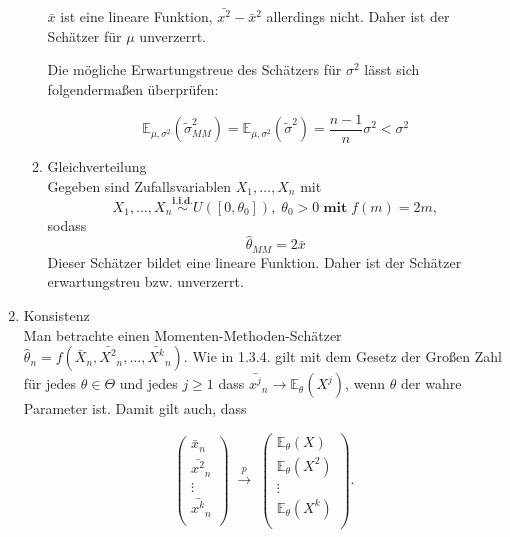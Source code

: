 \documentclass[10pt]{article}
\newcommand{\FZV}{X_1, \ldots, X_n} %
\newcommand{\EW}{\mathbb{E}} %
\begin{document}
\begin{enumerate}
\begin{enumerate}[label = (\roman*)]
		$\bar{x}$ ist eine lineare Funktion, $\bar{x^2}-\bar{x}^2$ allerdings nicht.  Daher ist der Schätzer für $\mu$ unverzerrt. 
		
		Die mögliche Erwartungstreue des Schätzers für $\sigma^2$ lässt sich folgendermaßen überprüfen:
		
		\begin{equation*}
			\EW_{\mu,\sigma^2} (\tilde{\sigma}^2_{MM}) = \EW_{\mu,\sigma^2} (\tilde{\sigma}^2) = \frac{n - 1 }{n} \sigma^2 < \sigma^2 
		\end{equation*}
	
			\item Gleichverteilung\\
		Gegeben sind Zufallsvariablen $\FZV$ mit
		\begin{equation*}
			\FZV \overset{\textbf{i.i.d.}}{\sim} U([0,\theta_0]), \; \theta_0 >0 \;\textbf{mit}\; f(m) = 2m,
		\end{equation*}
		sodass
		\begin{equation*}
			\hat{\theta}_{MM} = 2\bar{x}
		\end{equation*}
		Dieser Schätzer bildet eine lineare Funktion. Daher ist der Schätzer erwartungstreu bzw. unverzerrt. 
	\end{enumerate}	
	
	\item Konsistenz \\
	Man betrachte einen Momenten-Methoden-Schätzer $\hat{\theta}_n = f(\bar{X}_n, \bar{X^2}_n, \ldots, \bar{X^k}_n)$. Wie in 1.3.4. gilt mit dem Gesetz der Großen Zahl für jedes $\theta \in \Theta$ und jedes $j \geq 1$ dass $\bar{x^j}_n \longrightarrow \EW_\theta (X^j)$, wenn $\theta$ der wahre Parameter ist. Damit gilt auch, dass
	
		\begin{equation*}
		\left(
		\begin{array}{c}
			\bar{x}_n\\
			\bar{x^2}_n\\
			\vdots\\
			\bar{x^k}_n\\
		\end{array}
		\right)\; \overset{p}\longrightarrow \;
		\left(
		\begin{array}{c}
			\EW_\theta(X)\\
			\EW_\theta(X^2)\\
			\vdots\\
			\EW_\theta(X^k) \\
		\end{array}
		\right).
	\end{equation*}


\end{enumerate}
\end{document}
